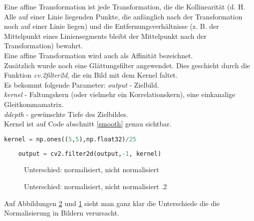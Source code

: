\begin{flushleft}
	Eine affine Transformation ist jede Transformation, die die Kollinearität (d. H.
	Alle auf einer Linie liegenden Punkte, die anfänglich nach der Transformation
	noch auf einer Linie liegen) und die Entfernungsverhältnisse (z. B. der
	Mittelpunkt eines Liniensegments bleibt der Mittelpunkt nach der Transformation)
	bewahrt. \\
	Eine affine Transformation wird auch als Affinität bezeichnet.\cite{affine}
	\\ 
	Zusätzlich wurde noch eine Glättungsfilter angewendet. Dies geschieht durch die
	Funktion \textit{cv.2filter2d}, die ein Bild mit dem Kernel faltet. \\
	Es bekommt folgende Parameter: 
	\textit{output} - Zielbild.\\
	\textit{kernel} - Faltungskern (oder vielmehr ein Korrelationskern), eine
	einkanalige Gleitkommamatrix.\\
	\textit{ddepth} - gewünschte Tiefe des Zielbildes. \cite{imgprz}\\
	
	Kernel ist auf Code abschnitt \ref{smooth} genau sichtbar. 
	
	\begin{lstlisting}[language=python,caption=Glättungsfilter,label=smooth]
	kernel = np.ones((5,5),np.float32)/25
	
	output = cv2.filter2d(output,-1, kernel)
	\end{lstlisting}
	
	\begin{figure}[H]
		\centering
		\qquad
		\caption{Unterschied: normalisiert, nicht normalisiert}
		\label{fig:norme}
		
	\end{figure}
	
	\begin{figure}[H]
		\centering
		\qquad
		\caption{Unterschied: normalisiert, nicht normalisiert .2}
		\label{fig:norm}
	\end{figure}
	
	
	Auf Abbildungen \ref{fig:norm} und \ref{fig:norme} sieht man ganz klar die
	Unterschiede die die Normalisierung in Bildern verursacht. 
\end{flushleft}

